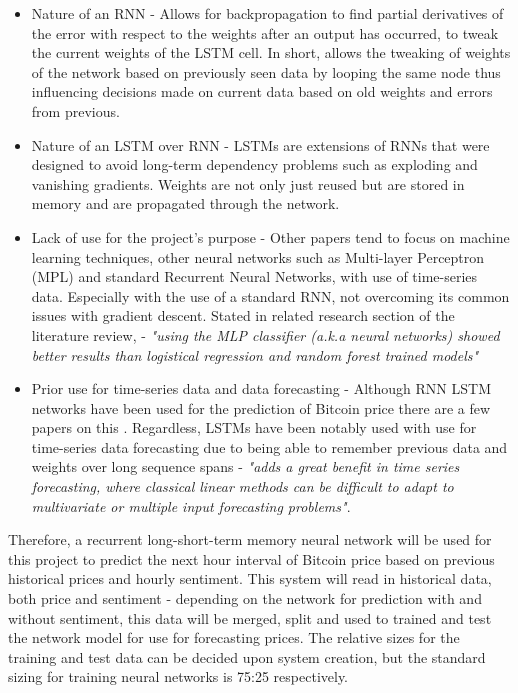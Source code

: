\documentclass[oneside, 12pt]{article}
\begin{document}
		\begin{itemize}
			\item Nature of an RNN - Allows for backpropagation to find partial derivatives of the error with respect to the weights after an output has occurred, to tweak the current weights of the LSTM cell. In short, allows the tweaking of weights of the network based on previously seen data by looping the same node thus influencing decisions made on current data based on old weights and errors from previous.
			\item Nature of an LSTM over RNN - LSTMs are extensions of RNNs \cite{LSTM} that were designed to avoid long-term dependency problems such as exploding and vanishing gradients. Weights are not only just reused but are stored in memory and are propagated through the network.
			\item Lack of use for the project's purpose - Other papers tend to focus on machine learning techniques, other neural networks such as Multi-layer Perceptron (MPL) and standard Recurrent Neural Networks, with use of time-series data. Especially with the use of a standard RNN, not overcoming its common issues with gradient descent. Stated in related research section of the literature review, \cite{StPNSentA} - \textit{"using the MLP classifier (a.k.a neural networks) showed better results than logistical regression and random forest trained models"}
			\item Prior use for time-series data and data forecasting - Although RNN LSTM networks have been used for the prediction of Bitcoin price there are a few papers on this \cite{LSTMforetime}. Regardless, LSTMs have been notably used with use for time-series data forecasting due to being able to remember previous data and weights over long sequence spans \cite{LSTMforetime} - \textit{"adds a great benefit in time series forecasting, where classical linear methods can be difficult to adapt to multivariate or multiple input forecasting problems"}.
		\end{itemize}
	
		Therefore, a recurrent long-short-term memory neural network will be used for this project to predict the next hour interval of Bitcoin price based on previous historical prices and hourly sentiment. This system will read in historical data, both price and sentiment - depending on the network for prediction with and without sentiment, this data will be merged, split and used to trained and test the network model for use for forecasting prices. The relative sizes for the training and test data can be decided upon system creation, but the standard sizing for training neural networks is 75:25 respectively.
		
\end{document}
